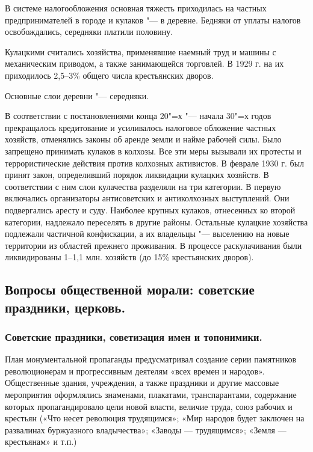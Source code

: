 В системе налогообложения основная тяжесть приходилась на частных предпринимателей в городе и кулаков "--- в деревне. Бедняки от уплаты налогов освобождались, середняки платили половину.

Кулацкими считались хозяйства, применявшие наемный труд и машины с механическим приводом, а также занимающейся торговлей. В 1929 г. на их приходилось 2,5--3\% общего числа крестьянских дворов.

Основные слои деревни "--- середняки.

В соответствии с постановлениями конца 20"=х "--- начала 30"=х годов прекращалось кредитование и усиливалось налоговое обложение частных хозяйств, отменялись законы об аренде земли и найме рабочей силы. Было запрещено принимать кулаков в колхозы. Все эти меры вызывали их протесты и террористические действия против колхозных активистов. В феврале 1930 г. был принят закон, определивший порядок ликвидации кулацких хозяйств. В соответствии с ним слои кулачества разделяли на три категории. В первую включались организаторы антисоветских и антиколхозных выступлений. Они подвергались аресту и суду. Наиболее крупных кулаков, отнесенных ко второй категории, надлежало переселять в другие районы. Остальные кулацкие хозяйства подлежали частичной конфискации, а их владельцы "--- выселению на новые территории из областей прежнего проживания. В процессе раскулачивания были ликвидированы 1--1,1 млн. хозяйств (до 15\% крестьянских дворов).

\subsection{Вопросы общественной морали: советские праздники, церковь.}

\subsubsection{\textbf{Советские праздники, советизация имен и топонимики.}}

План монументальной пропаганды предусматривал создание серии памятников революционерам и прогрессивным деятелям «всех времен и народов». Общественные здания, учреждения, а также праздники и другие массовые мероприятия оформлялись знаменами, плакатами, транспарантами, содержание которых пропагандировало цели новой власти, величие труда, союз рабочих и крестьян («Что несет революция трудящимся»; «Мир народов будет заключен на развалинах буржуазного владычества»; «Заводы — трудящимся»; «Земля — крестьянам» и т.п.)

